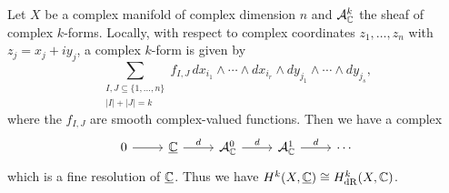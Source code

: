 \begin{remark}
  Let $X$ be a complex manifold
  of complex dimension $n$
  and $\mathcal{A}^k_{\mathbb{C}}$ the sheaf
  of complex $k$-forms.
  Locally, with respect to complex coordinates
  $z_1, \dots, z_n$
  with $z_j = x_j + i y_j$, a complex
  $k$-form is given by
  \[
    \sum_{\substack{I, J \subseteq \{1, \dots, n\} \\ |I| + |J| = k}} f_{I, J}\,
    dx_{i_1} \wedge \cdots \wedge dx_{i_r}
    \wedge dy_{j_1} \wedge \cdots \wedge dy_{j_s},
  \]
  where the $f_{I, J}$ are smooth
  complex-valued functions. Then we
  have a complex
  \[
    \begin{tikzcd}
      0 \ar[r] & \underline{\C}
      \ar[r, "d"] & \mathcal{A}^0_\C
      \ar[r, "d"] & \mathcal{A}^1_\C
      \ar[r, "d"] & \cdots
    \end{tikzcd}
  \]
  which is a fine resolution
  of $\underline{\mathbb{C}}$. Thus we have
  $H^k(X, \underline{\mathbb{C}}) \cong H^k_{\mathrm{dR}}(X, \mathbb{C})$.
\end{remark}

